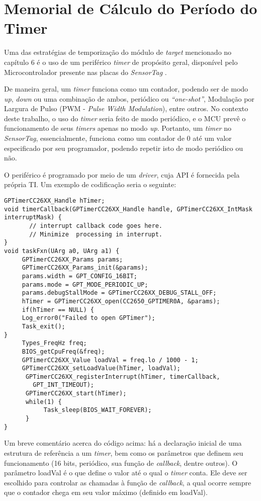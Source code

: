 \chapter{Memorial de Cálculo do Período do Timer}

Uma das estratégias de temporização do módulo de \emph{target} mencionado no capítulo 6 é o uso de um periférico \emph{timer} de propósito geral, disponível pelo Microcontrolador presente nas placas do \emph{SensorTag} \cite{datasheet}.

De maneira geral, um \emph{timer} funciona como um contador, podendo ser de modo \emph{up}, \emph{down} ou uma combinação de ambos, periódico ou \emph{“one-shot”}, Modulação por Largura de Pulso (PWM - \emph{Pulse Width Modulation}), entre outros. No contexto deste trabalho, o uso do \emph{timer} seria feito de modo periódico, e o MCU prevê o funcionamento de seus \emph{timers} apenas no modo \emph{up}. Portanto, um \emph{timer} no \emph{SensorTag}, essencialmente, funciona como um contador de 0 até um valor especificado por seu programador, podendo repetir isto de modo periódico ou não.

O periférico é programado por meio de um \emph{driver}, cuja API é fornecida pela própria TI. Um exemplo de codificação seria o seguinte:

\begin{lstlisting}
GPTimerCC26XX_Handle hTimer;
void timerCallback(GPTimerCC26XX_Handle handle, GPTimerCC26XX_IntMask interruptMask) {
       // interrupt callback code goes here.
       // Minimize  processing in interrupt.
}
void taskFxn(UArg a0, UArg a1) {
     GPTimerCC26XX_Params params;
     GPTimerCC26XX_Params_init(&params);
     params.width = GPT_CONFIG_16BIT;
     params.mode = GPT_MODE_PERIODIC_UP;
     params.debugStallMode = GPTimerCC26XX_DEBUG_STALL_OFF;
     hTimer = GPTimerCC26XX_open(CC2650_GPTIMER0A, &params);
     if(hTimer == NULL) {
     Log_error0("Failed to open GPTimer");
     Task_exit();
}
     Types_FreqHz freq;
     BIOS_getCpuFreq(&freq);
     GPTimerCC26XX_Value loadVal = freq.lo / 1000 - 1;
     GPTimerCC26XX_setLoadValue(hTimer, loadVal);
      GPTimerCC26XX_registerInterrupt(hTimer, timerCallback,
        GPT_INT_TIMEOUT);
      GPTimerCC26XX_start(hTimer);
      while(1) {
           Task_sleep(BIOS_WAIT_FOREVER);
      }
}
\end{lstlisting}

Um breve comentário acerca do código acima: há a declaração inicial de uma estrutura de referência a um \emph{timer}, bem como os parâmetros que definem seu funcionamento (16 bits, periódico, sua função de \emph{callback}, dentre outros). O parâmetro loadVal é o que define o valor até o qual o \emph{timer} conta. Ele deve ser escolhido para controlar as chamadas à função de \emph{callback}, a qual ocorre sempre que o contador chega em seu valor máximo (definido em loadVal).

